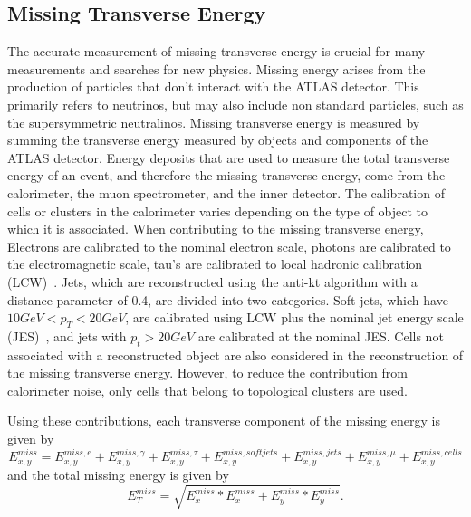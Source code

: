 \subsection{Missing Transverse Energy}
The accurate measurement of missing transverse energy is crucial for many measurements and searches for new physics.
Missing energy arises from the production of particles that don't interact with the ATLAS detector.
This primarily refers to neutrinos, but may also include non standard particles, such as the supersymmetric neutralinos.
Missing transverse energy is measured by summing the transverse energy measured by objects and components of the ATLAS detector.
Energy deposits that are used to measure the total transverse energy of an event, and therefore the missing transverse energy,
come from the calorimeter, the muon spectrometer, and the inner detector.
The calibration of cells or clusters in the calorimeter varies depending on the type of object to which
it is associated.
When contributing to the missing transverse energy, Electrons are calibrated to the nominal electron scale, photons
are calibrated to the electromagnetic scale, tau's are calibrated to local hadronic calibration (LCW)~\cite{BarillariLHC,JetEnergyMeasurement}.
Jets, which are reconstructed using the anti-kt algorithm with a distance parameter of 0.4, are divided
into two categories.
Soft jets, which have $10 GeV < p_T < 20 GeV$, are calibrated using LCW plus the nominal jet energy scale (JES)~\cite{JetEnergyMeasurement}, and
jets with $p_t > 20 GeV$ are calibrated at the nominal JES.
Cells not associated with a reconstructed object are also considered in the reconstruction of the missing transverse energy.
However, to reduce the contribution from calorimeter noise, only cells that belong to topological clusters
are used.

Using these contributions, each transverse component of the missing energy is given by
\begin{equation}
E^{miss}_{x,y} = E^{miss, e}_{x,y} + E^{miss, \gamma}_{x,y} + E^{miss, \tau}_{x,y} + E^{miss, softjets}_{x,y} + E^{miss, jets}_{x,y} + E^{miss, \mu}_{x,y} + E^{miss, cells}_{x,y}
\end{equation}
and the total missing energy is given by
\begin{equation}
E^{miss}_{T} = \sqrt{E^{miss}_{x}*E^{miss}_{x} + E^{miss}_{y}*E^{miss}_{y}}.
\end{equation}


